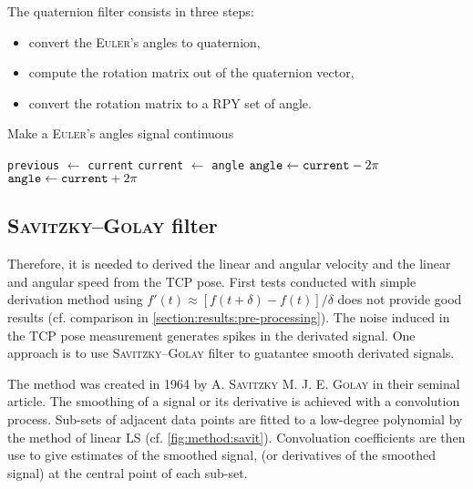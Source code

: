 \documentclass[/home/francois/latex/report/main.tex]{subfiles}
\begin{document}
The quaternion filter consists in three steps:

\begin{itemize}
  \item convert the \textsc{Euler}'s angles to quaternion,
  \item compute the rotation matrix out of the quaternion vector,
  \item convert the rotation matrix to a \ac{RPY} set of angle.
\end{itemize}

\begin{algorithm}
\caption{Make a \textsc{Euler}'s angles signal continuous\label{alg:method:continuity}}
\begin{algorithmic}
  \STATE \texttt{previous}  $\leftarrow$ \texttt{current}
  \STATE \texttt{current}  $\leftarrow$ \texttt{angle}
    \STATE $\text{\texttt{angle}} \leftarrow \text{\texttt{current}} - 2 \pi$
   \ELSE
    \STATE $\text{\texttt{angle}} \leftarrow \text{\texttt{current}} + 2 \pi$
   \ENDIF
  \ENDIF
 \ENDFOR
\ENDFOR
\end{algorithmic}
\end{algorithm}

\subsection{\textsc{Savitzky–Golay} filter}

Therefore, it is needed to derived the linear and angular velocity and the linear and angular speed from the \ac{TCP} pose. First tests conducted with simple derivation method using $f'(t) \approx  [f(t+\delta) - f(t)] / \delta$ does not provide good results (cf. comparison in \ref{section:results:pre-processing}). The noise induced in the \ac{TCP} pose measurement generates spikes in the derivated signal. One approach is to use \textsc{Savitzky–Golay} filter to guatantee smooth derivated signals.

The method was created in 1964 by A. \textsc{Savitzky} M. J. E. \textsc{Golay} \cite{Savitzky1964} in their seminal article. The smoothing of a signal or its derivative is achieved with a convolution process. Sub-sets of adjacent data points are fitted to a low-degree polynomial by the method of linear \ac{LS} (cf. \ref{fig:method:savit}). Convoluation coefficients are then use to give estimates of the smoothed signal, (or derivatives of the smoothed signal) at the central point of each sub-set.
\end{document}
